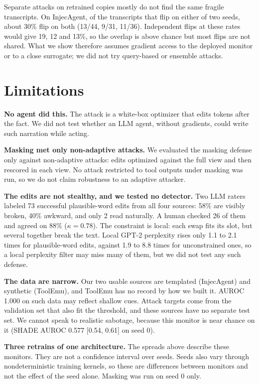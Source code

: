 \documentclass[letterpaper]{article} %
\begin{document}
Separate attacks on retrained copies mostly do not find the same fragile transcripts. On InjecAgent, of the transcripts that flip on either of two seeds, about 30\% flip on both (13/44, 9/31, 11/36). Independent flips at these rates would give 19, 12 and 13\%, so the overlap is above chance but most flips are not shared. What we show therefore assumes gradient access to the deployed monitor or to a close surrogate; we did not try query-based or ensemble attacks.

\section{Limitations}
\label{sec:limits}

\textbf{No agent did this.} The attack is a white-box optimizer that edits tokens after the fact. We did not test whether an LLM agent, without gradients, could write such narration while acting.

\textbf{Masking met only non-adaptive attacks.} We evaluated the masking defense only against non-adaptive attacks: edits optimized against the full view and then rescored in each view. No attack restricted to tool outputs under masking was run, so we do not claim robustness to an adaptive attacker.

\textbf{The edits are not stealthy, and we tested no detector.} Two LLM raters labeled 73 successful plausible-word edits from all four sources: 58\% are visibly broken, 40\% awkward, and only 2 read naturally. A human checked 26 of them and agreed on 88\% ($\kappa = 0.78$). The constraint is local: each swap fits its slot, but several together break the text. Local GPT-2 perplexity rises only 1.1 to 2.1 times for plausible-word edits, against 1.9 to 8.8 times for unconstrained ones, so a local perplexity filter may miss many of them, but we did not test any such defense.

\textbf{The data are narrow.} Our two usable sources are templated (InjecAgent) and synthetic (ToolEmu), and ToolEmu has no record by how we built it. AUROC 1.000 on such data may reflect shallow cues. Attack targets come from the validation set that also fit the threshold, and these sources have no separate test set. We cannot speak to realistic sabotage, because this monitor is near chance on it (SHADE AUROC 0.577 [0.54, 0.61] on seed 0).

\textbf{Three retrains of one architecture.} The spreads above describe these monitors. They are not a confidence interval over seeds. Seeds also vary through nondeterministic training kernels, so these are differences between monitors and not the effect of the seed alone. Masking was run on seed 0 only.
\end{document}
